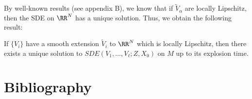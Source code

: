 \documentclass{scrartcl}
\begin{document}
By well-known results (see appendix B), we know that if $\tilde{V}_\alpha$ are locally Lipschitz, then the SDE on $\RR^N$ has a unique solution. Thus, we obtain the following result:

\begin{thm}
    If $\{V_i\}$ have a smooth extension $\tilde{V}_i$ to $\RR^N$ which is locally Lipschitz, then there exists a unique solution to $SDE(V_1,\dots, V_\ell; Z, X_0)$ on $M$ up to its explosion time.
\end{thm}





\section{Bibliography}

\let\oldoldsection\section
\renewcommand{\section}[2]{}%



\let\section\oldoldsection
\end{document}
